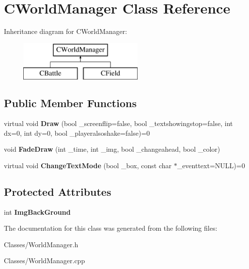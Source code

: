 \hypertarget{class_c_world_manager}{}\section{C\+World\+Manager Class Reference}
\label{class_c_world_manager}
Inheritance diagram for C\+World\+Manager\+:\begin{figure}[H]
\begin{center}
\leavevmode
\includegraphics[height=2.000000cm]{class_c_world_manager}
\end{center}
\end{figure}
\subsection*{Public Member Functions}
\begin{DoxyCompactItemize}
\item 
virtual void {\bfseries Draw} (bool \+\_\+screenflip=false, bool \+\_\+textshowingstop=false, int dx=0, int dy=0, bool \+\_\+playeralsoshake=false)=0\hypertarget{class_c_world_manager_a3f437c19a8b23825c063edef74147008}{}\label{class_c_world_manager_a3f437c19a8b23825c063edef74147008}

\item 
void {\bfseries Fade\+Draw} (int \+\_\+time, int \+\_\+img, bool \+\_\+changeahead, bool \+\_\+color)\hypertarget{class_c_world_manager_adcd133e5c515b8e08af3afc8e4c63a81}{}\label{class_c_world_manager_adcd133e5c515b8e08af3afc8e4c63a81}

\item 
virtual void {\bfseries Change\+Text\+Mode} (bool \+\_\+box, const char $\ast$\+\_\+eventtext=N\+U\+LL)=0\hypertarget{class_c_world_manager_ac28db43e7e957665b586477a82120651}{}\label{class_c_world_manager_ac28db43e7e957665b586477a82120651}

\end{DoxyCompactItemize}
\subsection*{Protected Attributes}
\begin{DoxyCompactItemize}
\item 
int {\bfseries Img\+Back\+Ground}\hypertarget{class_c_world_manager_abde5850fe47cc2992bcd42a6e1a91b64}{}\label{class_c_world_manager_abde5850fe47cc2992bcd42a6e1a91b64}

\end{DoxyCompactItemize}


The documentation for this class was generated from the following files\+:\begin{DoxyCompactItemize}
\item 
Classes/World\+Manager.\+h\item 
Classes/World\+Manager.\+cpp\end{DoxyCompactItemize}
